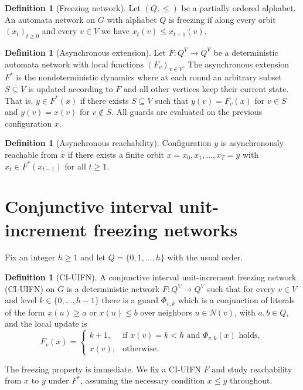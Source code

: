 \documentclass[final,3p,times]{elsarticle}
\theoremstyle{definition}
\newtheorem{definition}[theorem]{Definition}
\theoremstyle{remark}
\begin{document}
\begin{definition}[Freezing network]
Let $(Q,\le)$ be a partially ordered alphabet.
An automata network on $G$ with alphabet $Q$ is freezing if along every orbit $(x_t)_{t\ge 0}$ and every $v\in V$ we have $x_t(v)\le x_{t+1}(v)$.
\end{definition}

\begin{definition}[Asynchronous extension]
Let $F\colon Q^V\to Q^V$ be a deterministic automata network with local functions $(F_v)_{v\in V}$.
The asynchronous extension $F^\ast$ is the nondeterministic dynamics where at each round an arbitrary subset $S\subseteq V$ is updated according to $F$ and all other vertices keep their current state.
That is, $y\in F^\ast(x)$ if there exists $S\subseteq V$ such that $y(v)=F_v(x)$ for $v\in S$ and $y(v)=x(v)$ for $v\notin S$.
All guards are evaluated on the previous configuration $x$.
\end{definition}

\begin{definition}[Asynchronous reachability]
Configuration $y$ is asynchronously reachable from $x$ if there exists a finite orbit $x=x_0,x_1,\dots,x_T=y$ with $x_t\in F^\ast(x_{t-1})$ for all $t\ge 1$.
\end{definition}

\section{Conjunctive interval unit-increment freezing networks}

Fix an integer $h\ge 1$ and let $Q=\{0,1,\dots,h\}$ with the usual order.

\begin{definition}[CI-UIFN]\label{def:ciuifn}
A conjunctive interval unit-increment freezing network (CI-UIFN) on $G$ is a deterministic network $F\colon Q^V\to Q^V$ such that for every $v\in V$ and level $k\in\{0,\dots,h-1\}$ there is a guard $\Phi_{v,k}$ which is a conjunction of literals of the form $x(u)\ge a$ or $x(u)\le b$ over neighbors $u\in N(v)$, with $a,b\in Q$, and the local update is
\[
F_v(x)=
\begin{cases}
k+1,&\text{if }x(v)=k<h\text{ and }\Phi_{v,k}(x)\text{ holds},\\
x(v),&\text{otherwise.}
\end{cases}
\]
\end{definition}

The freezing property is immediate.
We fix a CI-UIFN $F$ and study reachability from $x$ to $y$ under $F^\ast$, assuming the necessary condition $x\le y$ throughout.
\end{document}
